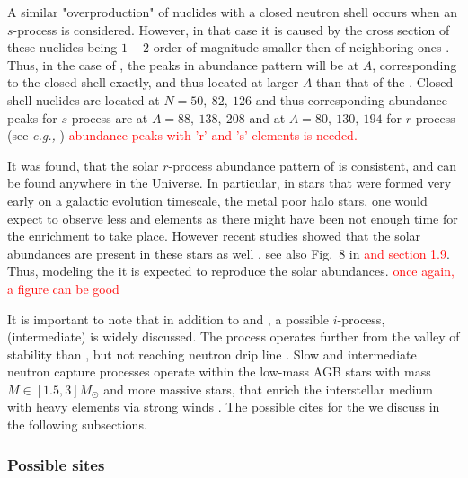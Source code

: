 A similar "overproduction" of nuclides with a closed neutron shell occurs when an $s$-process is considered. However, in that case it is caused by the cross section of these nuclides being $1-2$ order of magnitude smaller then of neighboring ones \citep{Rolfs:1988}. Thus, in the case of \sproc{}, the peaks in abundance pattern will be at $A$, corresponding to the closed shell exactly, and thus located at larger $A$ than that of the \rproc{}. 
Closed shell nuclides are located at $N=50,\: 82, \: 126$ and thus corresponding abundance peaks for $s$-process are at $A=88, \: 138, \: 208$ and at $A=80,\:130,\:194$ for $r$-process (see \textit{e.g.,} \citet{Arnould:2007gh}) 
\textcolor{red}{abundance peaks with 'r' and 's' elements is needed.}

It was found, that the solar $r$-process abundance pattern of \rproc{} is consistent, and can be found anywhere in the Universe. In particular, in stars that were formed very early on a galactic evolution timescale, the metal poor halo stars, one would expect to observe less \sproc{} and \rproc{} elements as there might have been not enough time for the enrichment to take place. However recent studies showed that the solar \rproc{} abundances are present in these stars as well \cite{Sneden:2008,Roederer:2010}, see also Fig.~$8$ in \cite{Sneden:2009} \textcolor{red}{and section 1.9}. Thus, modeling the \rproc{} \nuc{} it is expected to reproduce the solar abundances. \textcolor{red}{once again, a figure can be good}

It is important to note that in addition to \sproc{} and \rproc{}, a possible $i$-process, (intermediate) is widely discussed. The process operates further from the valley of stability than \sproc{}, but not reaching neutron drip line \citep{Cowan:1977,Bertolli:2013gka}. Slow and intermediate neutron capture processes operate within the low-mass \ac{AGB} stars with mass $M\in[1.5,3]M_{\odot}$ and more massive stars, that enrich the interstellar medium with heavy elements via strong winds  \citep[\eg][]{Peters:1968,Couch:1974,Kaeppeler:1994K,Woosley:2002,Straniero:2005hc,Herwig:2011}. The possible cites for the \rproc{} we discuss in the following subsections.


\subsubsection{Possible \rproc{} sites}


